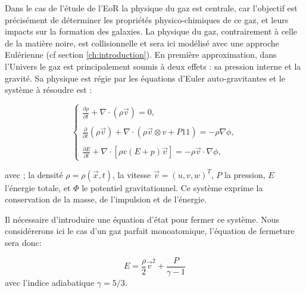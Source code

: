Dans le cas de l'étude de l'\ac{EoR} la physique du gaz est centrale, car l'objectif est précisément de déterminer les propriétés physico-chimiques de ce gaz, et leurs impacts sur la formation des galaxies.
La physique du gaz, contrairement à celle de la matière noire, est collisionnelle et sera ici modélisé avec une approche Eulérienne (cf section \ref{ch:introduction}).
En première approximation, dans l'Univers le gaz est principalement soumis à deux effets : sa pression interne et la gravité.
Sa physique est régie par les équations d'Euler auto-gravitantes et le système à résoudre est :

\begin{equation}
\begin{cases}

{ \frac{ \partial \rho }{ \partial t } + \nabla \cdot (\rho \vec{v}) = 0}, \\
\\
{ \frac{ \partial }{ \partial t } (\rho \vec{v}) + \nabla \cdot (\rho \vec{v} \otimes v + P1\!\!1 )  = -\rho\nabla \phi }, \\
\\
{ \frac{ \partial E }{ \partial t } + \nabla \cdot [ \rho v (E+p)\vec{v} ] = -\rho \vec{v} \cdot \nabla \phi },

\end{cases}
\end{equation}
\label{eq:hydro}

avec ;
la densité $\rho = \rho(\vec{x},t)$,
la vitesse $ \vec{v} = (u,v,w)^T$,
$P$ la pression, $E$ l’énergie totale, et $\Phi$ le potentiel gravitationnel.
Ce système exprime la conservation de la masse, de l'impulsion et de l'énergie.

Il nécessaire d'introduire une équation d'état pour fermer ce système.
Nous considérerons ici le cas d'un gaz parfait monoatomique, l'équation de fermeture sera donc:

%
\begin{equation}
E = \frac{\rho}{2}\vec{v}^2 + \frac{P}{\gamma -1}
\end{equation}
avec l'indice adiabatique $\gamma = 5/3$.



